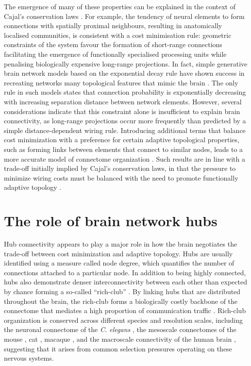 The emergence of many of these properties can be explained in the context of Cajal's conservation laws \citep{RamonyCajal1995}. For example, the tendency of neural elements to form connections with spatially proximal neighbours, resulting in anatomically localised communities, is consistent with a cost minimisation rule: geometric constraints of the system favour the formation of short-range connections facilitating the emergence of functionally specialised processing units while penalising biologically expensive long-range projections. In fact, simple generative brain network models based on the exponential decay rule have shown success in recreating networks many topological features that mimic the brain \citep{Ercsey-Ravasz2013,Henderson2014}. The only rule in such models states that connection probability is exponentially decreasing with increasing separation distance between network elements. However, several considerations indicate that this constraint alone is insufficient to explain brain connectivity, as long-range projections occur more frequently than predicted by a simple distance-dependent wiring rule. Introducing additional terms that balance cost minimization with a preference for certain adaptive topological properties, such as forming links between elements that connect to similar nodes, leads to a more accurate model of connectome organization \citep{Betzel2016,Vertes2012}. Such results are in line with a trade-off initially implied by Cajal's conservation laws, in that the pressure to minimize wiring costs must be balanced with the need to promote functionally adaptive topology \citep{Bullmore2012}.

\section{The role of brain network hubs}

Hub connectivity appears to play a major role in how the brain negotiates the trade-off between cost minimization and adaptive topology. Hubs are usually identified using a measure called node degree, which quantifies the number of connections attached to a particular node. In addition to being highly connected, hubs also demonstrate denser interconnectivity between each other than expected by chance forming a so-called ``rich-club'' \citep{Fulcher2016,Harriger2012,Towlson2013,VandenHeuvel2011,Zamora-Lopez2010}. By linking hubs that are distributed throughout the brain, the rich-club forms a biologically costly backbone of the connectome that mediates a high proportion of communication traffic \citep{VandenHeuvel2012}. Rich-club organization is conserved across different species and resolution scales, including the neuronal connectome of the \textit{C. elegans} \citep{Towlson2013}, the mesoscale connectomes of the mouse \citep{Oh2014,Fulcher2016}, cat \citep{DeReus2013b}, macaque \citep{Harriger2012}, and the macroscale connectivity of the human brain \citep{VandenHeuvel2011}, suggesting that it arises from common selection pressures operating on these nervous systems.

